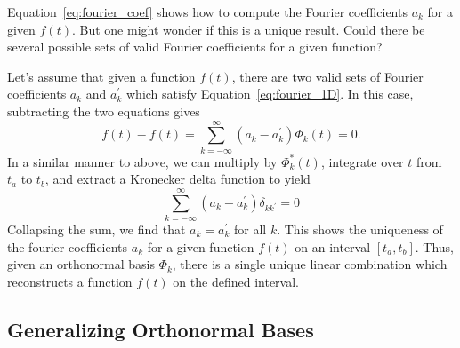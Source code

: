 Equation~\ref{eq:fourier_coef} shows how to compute the Fourier coefficients
$a_k$ for a given $f(t)$.  But one might wonder if this is a unique result.
Could there be several possible sets of valid Fourier coefficients for
a given function?

Let's assume that given a function $f(t)$, there are two valid sets of
Fourier coefficients $a_k$ and $a^\prime_k$ which satisfy
Equation~\ref{eq:fourier_1D}.  In this case, subtracting the two equations
gives
\begin{equation}
  f(t) - f(t) = \sum_{k=-\infty}^\infty (a_k - a^\prime_k)\Phi_k(t) = 0.
\end{equation}
In a similar manner to above, we can multiply by $\Phi^\ast_k(t)$, integrate
over $t$ from $t_a$ to $t_b$, and extract a Kronecker delta function to
yield
\begin{equation}
  \sum_{k=-\infty}^\infty (a_k - a^\prime_k) \delta_{kk^\prime} = 0
\end{equation}
Collapsing the sum, we find that $a_k = a^\prime_k$ for all $k$.  This
shows the uniqueness of the fourier coefficients $a_k$ for a given function
$f(t)$ on an interval $[t_a, t_b]$.  Thus, given an orthonormal basis $\Phi_k$,
there is a single unique linear combination which reconstructs a function
$f(t)$ on the defined interval.

\subsection{Generalizing Orthonormal Bases}

